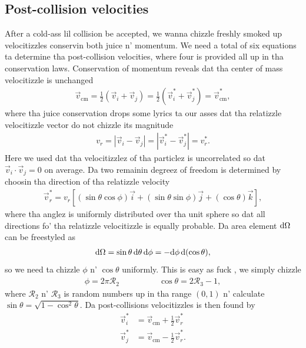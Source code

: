 \subsection{Post-collision velocities}
After a cold-ass lil collision be accepted, we wanna chizzle freshly smoked up velocitizzles conservin both juice n' momentum. We need a total of six equations ta determine tha post-collision velocities, where four is provided all up in tha conservation laws. Conservation of momentum reveals dat tha center of mass velocitizzle is unchanged
\begin{align}
	\vec v_\text{cm} = \frac{1}{2}(\vec v_i + \vec v_j) = \frac{1}{2}(\vec v_i^* + \vec v_j^*) = \vec v_\text{cm}^*,
\end{align}
where tha juice conservation  drops some lyrics ta our asses dat tha relatizzle velocitizzle vector do not chizzle its magnitude
\begin{align}
	v_r = |\vec v_i - \vec v_j| = |\vec v_i^* - \vec v_j^*| = v_r^*.
\end{align}
Here we used dat tha velocitizzlez of tha particlez is uncorrelated so dat $\vec v_i\cdot\vec v_j = 0$ on average. Da two remainin degreez of freedom is determined by choosin tha direction of tha relatizzle velocity
\begin{align}
	\vec v_r^* = v_r\left[(\sin\theta\cos\phi)\vec i + (\sin\theta\sin\phi) \vec j + (\cos\theta)\vec k\right],
\end{align}
where tha anglez is uniformly distributed over tha unit sphere so dat all directions fo' tha relatizzle velocitizzle is equally probable. Da area element $\mathrm{d}\Omega$ can be freestyled as
\begin{align}
	\mathrm{d}\Omega = \sin\theta\,\mathrm{d}\theta\,\mathrm{d}\phi = -\mathrm{d}\phi\,\mathrm{d}(\cos\theta),
\end{align}
so we need ta chizzle $\phi$ n' $\cos\theta$ uniformly. This is easy as fuck , we simply chizzle 
\begin{align*}
	\phi = 2\pi\mathcal{R}_2 & \qquad \qquad \cos\theta = 2\mathcal{R}_3 - 1,
\end{align*}
where $\mathcal{R}_2$ n' $\mathcal{R}_3$ is random numbers up in tha range $(0,1)$ n' calculate $\sin\theta = \sqrt{1 - \cos^2\theta}$. Da post-collisions velocitizzles is then found by
\begin{align}
	\vec v_i^* &= \vec v_\text{cm} + \frac{1}{2}\vec v_r^*\\
	\vec v_j^* &= \vec v_\text{cm} - \frac{1}{2}\vec v_r^*.
\end{align}